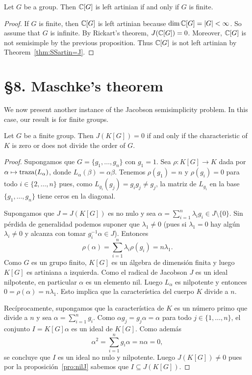 \begin{theorem}
	Let $G$ be a group. Then $\mathbb{C}[G]$ 
	is left artinian if and only if 
	$G$ is finite. 
\end{theorem}

\begin{proof}
    If $G$ is finite, then $\mathbb{C}[G]$ is left artinian because $\dim\mathbb{C}[G]=|G|<\infty$. So assume that 
    $G$ is infinite. By Rickart's theorem,   
	$J(\mathbb{C}[G])=0$. Moreover, $\mathbb{C}[G]$
	is not semisimple by the previous proposition. Thus
	$\mathbb{C}[G]$ is not left artinian by Theorem~\ref{thm:SSartin=J}.
\end{proof}

\section*{\S8. Maschke's theorem}

We now present another instance of the Jacobson semisimplicity problem.
In this case, our result is for finite groups. 

\begin{theorem}[Maschke]
	Let $G$ be a finite group. Then $J(K[G])=0$ if and only 
	if the characteristic of $K$ is zero 
	or does not divide the order of $G$. 
\end{theorem}

\begin{proof}
	Supongamos que $G=\{g_1,\dots,g_n\}$ con $g_1=1$. Sea $\rho\colon K[G]\to
	K$ dada por $\alpha\mapsto\operatorname{traza}(L_{\alpha})$, donde
	$L_{\alpha}(\beta)=\alpha\beta$. Tenemos $\rho(g_1)=n$ y $\rho(g_i)=0$ para
	todo $i\in\{2,\dots,n\}$ pues,  como $L_{g_i}(g_j)=g_{i}g_j\ne g_j$, la
	matriz de $L_{g_i}$ en la base $\{g_1,\dots,g_n\}$ tiene ceros en la
	diagonal.

	Supongamos que $J=J(K[G])$ es no nulo y sea
	$\alpha=\sum_{i=1}^n\lambda_ig_i\in J\setminus\{0\}$. Sin pérdida de
	generalidad podemos suponer que $\lambda_1\ne 0$ (pues si $\lambda_1=0$ hay
	algún $\lambda_i\ne 0$ y alcanza con tomar $g_i^{-1}\alpha\in J$). Entonces
	\[
		\rho(\alpha)=\sum_{i=1}^n \lambda_i\rho(g_i)=n\lambda_1.
	\]
	Como $G$ es un grupo finito, $K[G]$ es un álgebra de dimensión finita y
	luego $K[G]$ es artiniana a izquierda. Como el radical de Jacobson $J$ es
	un ideal nilpotente, en particular $\alpha$ es un elemento nil. Luego
	$L_{\alpha}$ es nilpotente y entonces $0=\rho(\alpha)=n\lambda_1$. Esto
	implica que la característica del cuerpo $K$ divide a $n$. 

	Recíprocamente, supongamos que la característica de $K$ es un número primo
	que divide a $n$ y sea $\alpha=\sum_{i=1}^ng_i$. Como $\alpha
	g_j=g_j\alpha=\alpha$ para todo $j\in\{1,\dots,n\}$, el conjunto
	$I=K[G]\alpha$ es un ideal de $K[G]$. Como además 
	\[
		\alpha^2=\sum_{i=1}^n g_i\alpha=n\alpha=0,
	\]
	se concluye que $I$ es un ideal no nulo y nilpotente. Luego $J(K[G])\ne 0$
	pues por la proposición~\ref{pro:nilJ} sabemos que $I\subseteq J(K[G])$.
\end{proof}

